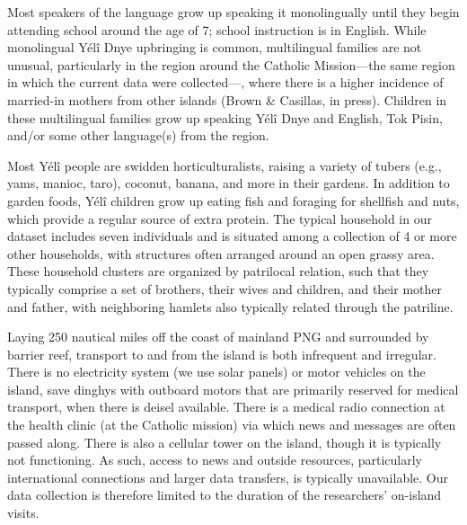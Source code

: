 \documentclass[english,,man,floatsintext]{apa6}
\begin{document}
Most speakers of the language grow up speaking it monolingually until
they begin attending school around the age of 7; school instruction is
in English. While monolingual Yélî Dnye upbringing is common,
multilingual families are not unusual, particularly in the region around
the Catholic Mission---the same region in which the current data were
collected---, where there is a higher incidence of married-in mothers
from other islands (Brown \& Casillas, in press). Children in these
multilingual families grow up speaking Yélî Dnye and English, Tok Pisin,
and/or some other language(s) from the region.

Most Yélî people are swidden horticulturalists, raising a variety of
tubers (e.g., yams, manioc, taro), coconut, banana, and more in their
gardens. In addition to garden foods, Yélî children grow up eating fish
and foraging for shellfish and nuts, which provide a regular source of
extra protein. The typical household in our dataset includes seven
individuals and is situated among a collection of 4 or more other
households, with structures often arranged around an open grassy area.
These household clusters are organized by patrilocal relation, such that
they typically comprise a set of brothers, their wives and children, and
their mother and father, with neighboring hamlets also typically related
through the patriline.

Laying 250 nautical miles off the coast of mainland PNG and surrounded
by barrier reef, transport to and from the island is both infrequent and
irregular. There is no electricity system (we use solar panels) or motor
vehicles on the island, save dinghys with outboard motors that are
primarily reserved for medical transport, when there is deisel
available. There is a medical radio connection at the health clinic (at
the Catholic mission) via which news and messages are often passed
along. There is also a cellular tower on the island, though it is
typically not functioning. As such, access to news and outside
resources, particularly international connections and larger data
transfers, is typically unavailable. Our data collection is therefore
limited to the duration of the researchers' on-island visits.
\end{document}
